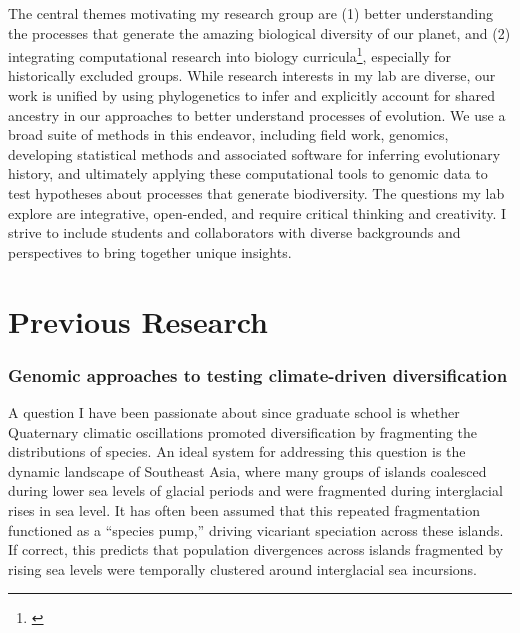 \noindent
The central themes motivating my research group are
(1) better understanding the processes that generate the amazing biological
diversity of our planet,
and
(2) integrating computational research into biology
curricula\footnote{\label{Wright19}\hspace{-0.8em}},
especially for historically excluded groups.
While research interests in my lab are diverse, our work is unified by using
phylogenetics to infer and explicitly account for shared ancestry in our
approaches to better understand processes of evolution.
We use a broad suite of methods in this endeavor, including
field work,
genomics,
developing statistical methods and associated software for inferring
evolutionary history, and ultimately applying these computational tools to
genomic data to test
hypotheses about processes that generate biodiversity.
The questions my lab explore are integrative, open-ended, and require critical
thinking and creativity.
I strive to include students and collaborators with diverse backgrounds and
perspectives to bring together unique insights.

\section*{Previous Research}
\subsubsection*{Genomic approaches to testing climate-driven diversification}
A question I have been passionate about since graduate school is whether
Quaternary climatic oscillations promoted diversification by fragmenting the
distributions of species.
An ideal system for addressing this question is the dynamic landscape of
Southeast Asia, where many groups of islands coalesced during lower sea levels
of glacial periods and were fragmented during interglacial rises in sea level.
It has often been assumed that this repeated fragmentation functioned as a
``species pump,'' driving vicariant speciation across these islands.
If correct, this predicts that population divergences across islands fragmented
by rising sea levels were temporally clustered around interglacial sea
incursions.

